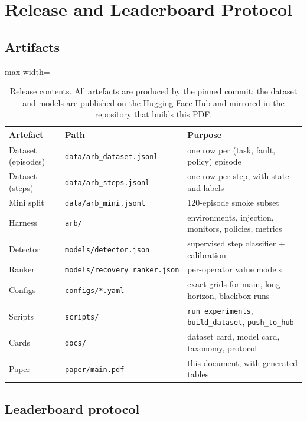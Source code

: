 \section{Release and Leaderboard Protocol}\label{sec:release}

\subsection{Artifacts}

\begin{table}[h]
\centering\small
\caption{Release contents. All artefacts are produced by the pinned commit; the dataset and models
are published on the Hugging Face Hub and mirrored in the repository that builds this PDF.}
\label{tab:release}
\footnotesize
\setlength{\tabcolsep}{4pt}
\begin{adjustbox}{max width=\textwidth}
\begin{tabular}{@{}lll@{}}
\toprule
Artefact & Path & Purpose \\
\midrule
Dataset (episodes) & \texttt{data/arb\_dataset.jsonl} & one row per (task, fault, policy) episode \\
Dataset (steps) & \texttt{data/arb\_steps.jsonl} & one row per step, with state and labels \\
Mini split & \texttt{data/arb\_mini.jsonl} & 120-episode smoke subset \\
Harness & \texttt{arb/} & environments, injection, monitors, policies, metrics \\
Detector & \texttt{models/detector.json} & supervised step classifier + calibration \\
Ranker & \texttt{models/recovery\_ranker.json} & per-operator value models \\
Configs & \texttt{configs/*.yaml} & exact grids for main, long-horizon, blackbox runs \\
Scripts & \texttt{scripts/} & \texttt{run\_experiments}, \texttt{build\_dataset}, \texttt{push\_to\_hub} \\
Cards & \texttt{docs/} & dataset card, model card, taxonomy, protocol \\
Paper & \texttt{paper/main.pdf} & this document, with generated tables \\
\bottomrule
\end{tabular}
\end{adjustbox}
\end{table}

\subsection{Leaderboard protocol}

